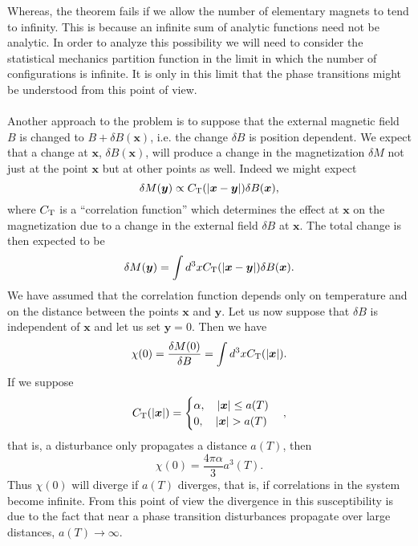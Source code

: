 Whereas, the theorem fails if we allow the number of elementary magnets to tend to infinity. This is because an infinite sum of analytic functions need not be analytic. 
In order to analyze this possibility we will need to consider the statistical mechanics partition function in the limit in which the number of configurations is infinite. It is only in this limit that the phase transitions might be understood from this point of view.
\\ \\
Another approach to the problem is to suppose that the external magnetic field $B$ is changed to $B + \delta B(\bm{x})$, i.e. the change $\delta B$ is position dependent. We expect that a change at $\bm{x}$, $\delta B(\bm{x})$, will produce a change in the magnetization $\delta M$ not just at the point $\bm{x}$ but at other points as well. Indeed we might expect
\[\delta M(\bm{y}) \propto C_{\rm T}(|\bm{x}-\bm{y}|)\delta B(\bm{x}),\]
where $C_{\rm T}$ is a ``correlation function'' which determines the effect at $\bm{x}$ on the magnetization due to a change in the external field $\delta B$ at $\bm{x}$. The total change
is then expected to be
\[\delta M(\bm{y}) = \int d^3x C_{\rm T}(|\bm{x}-\bm{y}|)\delta B(\bm{x}).\]
We have assumed that the correlation function depends only on temperature and on the distance between the points $\bm{x}$ and $\bm{y}$.
Let us now suppose that $\delta B$ is independent of $\bm{x}$ and let us set $\bm{y} = 0$. Then we have
\[\chi(0) = \frac{\delta M(0)}{\delta B} = \int d^3x C_{\rm T}(|\bm{x}|).\]
If we suppose
\[C_{\rm T}(|\bm{x}|) = \begin{cases} \alpha , \quad |\bm{x}| \leq a(T) \\ 0 , \quad |\bm{x}| > a(T) \end{cases},\]
that is, a disturbance only propagates a distance $a(T)$, then
\[\chi(0) = \frac{4\pi \alpha}{3} a^3(T).\]
Thus $\chi(0)$ will diverge if $a(T)$ diverges, that is, if correlations in the system become infinite. From this point of view the divergence in this susceptibility is due to the fact that near a phase transition disturbances propagate over large distances, $a(T) \to \infty$. 


